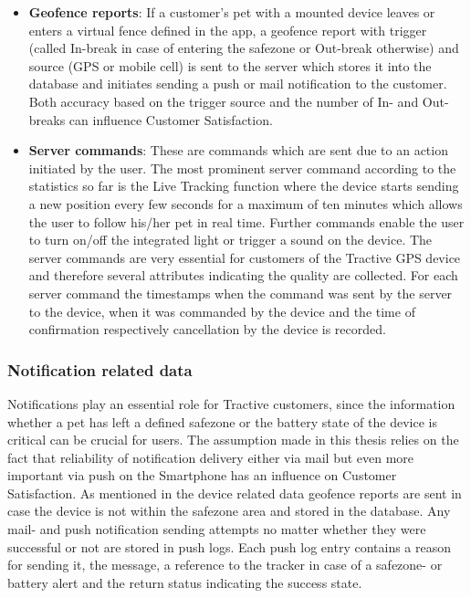 \begin{itemize}
	\item \textbf{Geofence reports}: If a customer's pet with a mounted device leaves or enters a virtual fence defined in the app, a geofence report with trigger (called In-break in case of entering the safezone or Out-break otherwise) and source (GPS or mobile cell) is sent to the server which stores it into the database and initiates sending a push or mail notification to the customer. Both accuracy based on the trigger source and the number of In- and Out-breaks can influence Customer Satisfaction. 
	\item \textbf{Server commands}: These are commands which are sent due to an action initiated by the user. The most prominent server command according to the statistics so far is the Live Tracking function where the device starts sending a new position every few seconds for a maximum of ten minutes which allows the user to follow his/her pet in real time. Further commands enable the user to turn on/off the integrated light or trigger a sound on the device. The server commands are very essential for customers of the Tractive GPS device and therefore several attributes indicating the quality are collected. For each server command the timestamps when the command was sent by the server to the device, when it was commanded by the device and the time of confirmation respectively cancellation by the device is recorded. 
\end{itemize}

\subsubsection{Notification related data} 
Notifications play an essential role for Tractive customers, since the information whether a pet has left a defined safezone or the battery state of the device is critical can be crucial for users. The assumption made in this thesis relies on the fact that reliability of notification delivery either via mail but even more important via push on the Smartphone has an influence on Customer Satisfaction. As mentioned in the device related data geofence reports are sent in case the device is not within the safezone area and stored in the database. Any mail- and push notification sending attempts no matter whether they were successful or not are stored in push logs. Each push log entry contains a reason for sending it, the message, a reference to the tracker in case of a safezone- or battery alert and the return status indicating the success state. 

